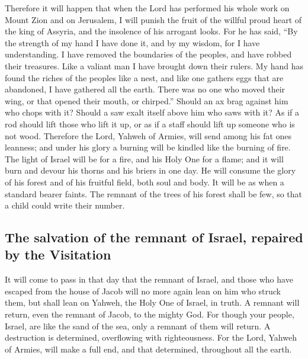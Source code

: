  Therefore it will happen that when the Lord has
performed his whole work on Mount Zion and on Jerusalem, I will punish
the fruit of the willful proud heart of the king of Assyria, and the
insolence of his arrogant looks.  For he has said, ``By
the strength of my hand I have done it, and by my wisdom, for I have
understanding. I have removed the boundaries of the peoples, and have
robbed their treasures. Like a valiant man I have brought down their
rulers.  My hand has found the riches of the peoples like
a nest, and like one gathers eggs that are abandoned, I have gathered
all the earth. There was no one who moved their wing, or that opened
their mouth, or chirped.''  Should an ax brag against him
who chops with it? Should a saw exalt itself above him who saws with it?
As if a rod should lift those who lift it up, or as if a staff should
lift up someone who is not wood.  Therefore the Lord,
Yahweh of Armies, will send among his fat ones leanness; and under his
glory a burning will be kindled like the burning of fire.
 The light of Israel will be for a fire, and his Holy One
for a flame; and it will burn and devour his thorns and his briers in
one day.  He will consume the glory of his forest and of
his fruitful field, both soul and body. It will be as when a standard
bearer faints.  The remnant of the trees of his forest
shall be few, so that a child could write their number.

\hypertarget{the-salvation-of-the-remnant-of-israel-repaired-by-the-visitation}{%
\subsection{The salvation of the remnant of Israel, repaired by the
Visitation}\label{the-salvation-of-the-remnant-of-israel-repaired-by-the-visitation}}

 It will come to pass in that day that the remnant of
Israel, and those who have escaped from the house of Jacob will no more
again lean on him who struck them, but shall lean on Yahweh, the Holy
One of Israel, in truth.  A remnant will return, even the
remnant of Jacob, to the mighty God.  For though your
people, Israel, are like the sand of the sea, only a remnant of them
will return. A destruction is determined, overflowing with
righteousness.  For the Lord, Yahweh of Armies, will make
a full end, and that determined, throughout all the earth.

